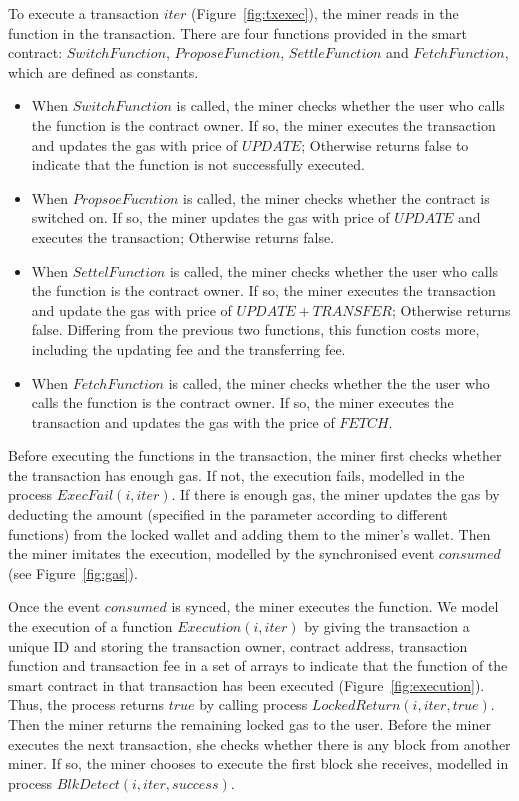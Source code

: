 \documentclass{KERauth}
\begin{document}
To execute a transaction $iter$ (Figure~\ref{fig:txexec}), the miner reads in the function in the transaction. There are four functions provided in the smart contract: $SwitchFunction$, $ProposeFunction$, $SettleFunction$ and $FetchFunction$, which are defined as constants.
\begin{itemize}
    \item When $SwitchFunction$ is called, the miner checks whether the user who calls the function is the contract owner. If so, the miner executes the transaction and updates the gas with price of $UPDATE$; Otherwise returns false to indicate that the function is not successfully executed.
    \item When $PropsoeFucntion$ is called, the miner checks whether the contract is switched on. If so, the miner updates the gas with price of $UPDATE$ and executes the transaction; Otherwise returns false.
    \item When $SettelFunction$ is called, the miner checks whether the user who calls the function is the contract owner. If so, the miner executes the transaction and update the gas with price of $UPDATE + TRANSFER$; Otherwise returns false. Differing from the previous two functions, this function costs more, including the updating fee and the transferring fee.
    \item When $FetchFunction$ is called, the miner checks whether the the user who calls the function is the contract owner. If so, the miner executes the transaction and updates the gas with the price of $FETCH$.
\end{itemize}  

Before executing the functions in the transaction, the miner first checks whether the transaction has enough gas. If not, the execution fails, modelled in the process $ExecFail(i, iter)$. If there is enough gas, the miner updates the gas by deducting the amount (specified in the parameter according to different functions) from the locked wallet and adding them to the miner's wallet. Then the miner imitates the execution, modelled by the synchronised event $consumed$ (see Figure~\ref{fig:gas}).

Once the event $consumed$ is synced, the miner executes the function. We model the execution of a function $Execution(i, iter)$ by giving the transaction a unique ID and storing the transaction owner, contract address, transaction function and transaction fee in a set of arrays to indicate that the function of the smart contract in that transaction has been executed (Figure~\ref{fig:execution}). Thus, the process returns $true$ by calling process $LockedReturn(i, iter, true)$. Then the miner returns the remaining locked gas to the user. Before the miner executes the next transaction, she checks whether there is any block from another miner. If so, the miner chooses to execute the first block she receives, modelled in process $BlkDetect(i, iter, success)$.
\end{document}

